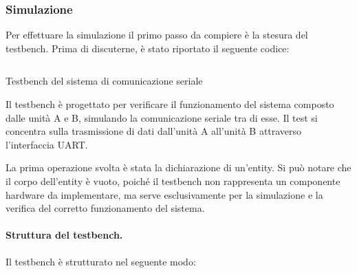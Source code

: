 \subsubsection{Simulazione}
Per effettuare la simulazione il primo passo da compiere è la stesura del testbench. Prima di discuterne, è stato riportato il seguente codice:

\begin{code}
    \inputminted{vhdl}{vhdl/serial_tb.vhd}
    \caption{Testbench del sistema di comunicazione seriale}
    \label{cod:serial_tb}
\end{code}

Il testbench è progettato per verificare il funzionamento del sistema composto dalle unità A e B, simulando la comunicazione seriale tra di esse. Il test si concentra sulla trasmissione di dati dall’unità A all’unità B attraverso l’interfaccia UART.

La prima operazione svolta è stata la dichiarazione di un’entity. Si può notare che il corpo dell’entity è vuoto, poiché il testbench non rappresenta un componente hardware da implementare, ma serve esclusivamente per la simulazione e la verifica del corretto funzionamento del sistema.

\paragraph{Struttura del testbench.}
Il testbench è strutturato nel seguente modo:

